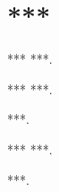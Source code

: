\chapter*{***}

\begin{Thm}[label={thm:***}]{***}
***.
\end{Thm}

\begin{Def}{***}
***.
\end{Def}

\begin{Exmp}
***.
\end{Exmp}

\begin{Dem*}{***}
***.
\end{Dem*}

***.

